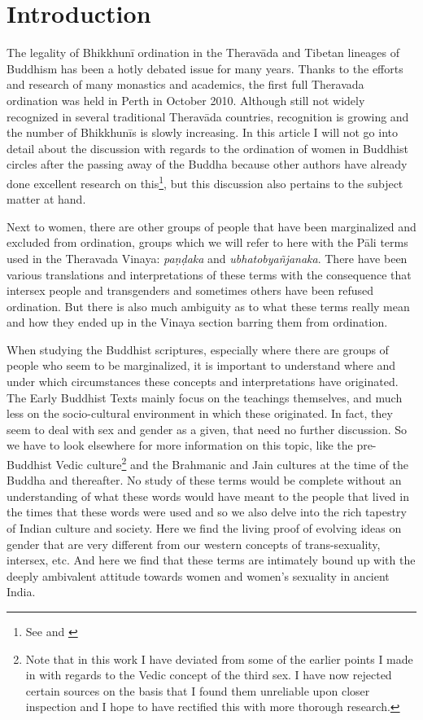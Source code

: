 \section{Introduction}
The legality of Bhikkhunī ordination in the Theravāda and Tibetan lineages of Buddhism has been a hotly debated issue for many years. Thanks to the efforts and research of many monastics and academics, the first full Theravada ordination was held in Perth in October 2010. Although still not widely recognized in several traditional Theravāda countries, recognition is growing and the number of Bhikkhunīs is slowly increasing. In this article I will not go into detail about the discussion with regards to the ordination of women in Buddhist circles after the passing away of the Buddha because other authors have already done excellent research on this\footnote{See \cite{sujato2009} and \cite{analayo2013}}, but this discussion also pertains to the subject matter at hand.

Next to women, there are other groups of people that have been marginalized and excluded from ordination, groups which we will refer to here with the Pāli terms used in the Theravada Vinaya: {\em paṇḍaka} and {\em ubhatob­yañ­janaka}. There have been various translations and interpretations of these terms with the consequence that intersex people and transgenders and sometimes others have been refused ordination. But there is also much ambiguity as to what these terms really mean and how they ended up in the Vinaya section barring them from ordination.

When studying the Buddhist scriptures, especially where there are groups of people who seem to be marginalized, it is important to understand where and under which circumstances these concepts and interpretations have originated. The Early Buddhist Texts mainly focus on the teachings themselves, and much less on the socio-cultural environment in which these originated. In fact, they seem to deal with sex and gender as a given, that need no further discussion. So we have to look elsewhere for more information on this topic, like the pre-Buddhist Vedic culture\footnote{Note that in this work I have deviated from some of the earlier points I made in \cite{vimala} with regards to the Vedic concept of the third sex. I have now rejected certain sources on the basis that I found them unreliable upon closer inspection and I hope to have rectified this with more thorough research.} and the Brahmanic and Jain cultures at the time of the Buddha and thereafter. No study of these terms would be complete without an understanding of what these words would have meant to the people that lived in the times that these words were used and so we also delve into the rich tapestry of Indian  culture and society. Here we find the living proof of evolving ideas on gender that are very different from our western concepts of trans-sexuality, intersex, etc. And here we find that these terms are intimately bound up with the deeply ambivalent attitude towards women and women's sexuality in ancient India.

